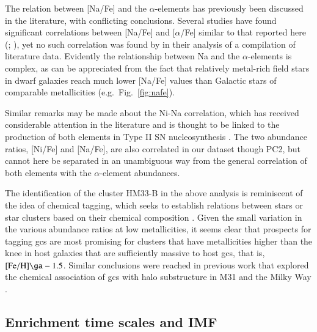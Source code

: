 \documentclass{aa}
\begin{document}
The relation between [Na/Fe] and the $\alpha$-elements has previously been discussed in the literature, with conflicting conclusions. Several studies have found significant correlations between [Na/Fe] and [$\alpha$/Fe] similar to that reported here (\citealt{Fulbright2002}; ), yet no such correlation was found by  in their analysis of a compilation of literature data. 
Evidently the relationship between Na and the $\alpha$-elements is complex, as can be appreciated from the fact that relatively metal-rich field stars in dwarf galaxies reach much lower [Na/Fe] values than Galactic stars of comparable metallicities (e.g.\ Fig.~\ref{fig:nafe}). 

Similar remarks may be made about the Ni-Na correlation, which has received considerable attention in the literature and is thought to be linked to the production of both elements in Type II SN nucleosynthesis \citep{Nissen1997,Cohen2010,Letarte2010,Lemasle2014}. The two abundance ratios, [Ni/Fe] and [Na/Fe], are also correlated in our dataset though PC2, but cannot here be separated in an unambiguous way from the general correlation of both elements with the $\alpha$-element abundances.

The identification of the cluster HM33-B in the above analysis is reminiscent of the idea of chemical tagging, which seeks to establish relations between stars or star clusters based on their chemical composition \citep{Freeman2002}. Given the small variation in the various abundance ratios at low metallicities, it seems clear that prospects for tagging \acp{gc} are most promising for clusters that have metallicities higher than the knee in host galaxies that are sufficiently massive to host \acp{gc}, that is, $\mathrm{[Fe/H]} \ga -1.5$.
Similar conclusions were reached in previous work that explored the chemical association of \acp{gc} with halo substructure in M31 \citep{Sakari2014,Sakari2015} and the Milky Way \citep{Horta2020}.


\subsection{Enrichment time scales and IMF}
\end{document}
